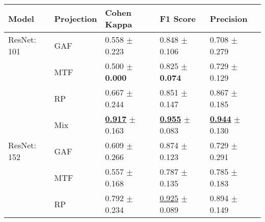 
\begin{tabular}{lllll}
\toprule
Model & Projection & Cohen Kappa & F1 Score & Precision \\
\midrule
ResNet: 101 & GAF & \textcolor[rgb]{0.8016949153,0.1983050847,0}{0.558} $\pm$ \textcolor[rgb]{0.8390827308,0.1609172692,0}{0.223} & \textcolor[rgb]{0.5824436536,0.4175563464,0}{0.848} $\pm$ \textcolor[rgb]{0.3085501457,0.5000000000,0}{0.106} & \textcolor[rgb]{0.8947368421,0.1052631579,0}{0.708} $\pm$ \textcolor[rgb]{0.9153570597,0.0846429403,0}{0.279} \\
 & MTF & \textcolor[rgb]{0.9322033898,0.0677966102,0}{0.500} $\pm$ \textbf{\textcolor[rgb]{0.0000000000,0.5000000000,0}{0.000}} & \textcolor[rgb]{0.7089758798,0.2910241202,0}{0.825} $\pm$ \textbf{\textcolor[rgb]{0.0000000000,0.5000000000,0}{0.074}} & \textcolor[rgb]{0.8157894737,0.1842105263,0}{0.729} $\pm$ \textcolor[rgb]{0.0086983842,0.5000000000,0}{0.129} \\
 & RP & \textcolor[rgb]{0.5593220339,0.4406779661,0}{0.667} $\pm$ \textcolor[rgb]{0.9177344209,0.0822655791,0}{0.244} & \textcolor[rgb]{0.5663107948,0.4336892052,0}{0.851} $\pm$ \textcolor[rgb]{0.6997338079,0.3002661921,0}{0.147} & \textcolor[rgb]{0.2947368421,0.5000000000,0}{0.867} $\pm$ \textcolor[rgb]{0.3495262089,0.5000000000,0}{0.185} \\
 & Mix & \underline{\textbf{\textcolor[rgb]{0.0000000000,0.5000000000,0}{0.917}}} $\pm$ \textcolor[rgb]{0.6114994881,0.3885005119,0}{0.163} & \underline{\textbf{\textcolor[rgb]{0.0000000000,0.5000000000,0}{0.955}}} $\pm$ \textcolor[rgb]{0.0859174230,0.5000000000,0}{0.083} & \underline{\textbf{\textcolor[rgb]{0.0000000000,0.5000000000,0}{0.944}}} $\pm$ \textcolor[rgb]{0.0148524795,0.5000000000,0}{0.130} \\
ResNet: 152 & GAF & \textcolor[rgb]{0.6881355932,0.3118644068,0}{0.609} $\pm$ \textcolor[rgb]{1.0000000000,0.0000000000,0}{0.266} & \textcolor[rgb]{0.4400948992,0.5000000000,0}{0.874} $\pm$ \textcolor[rgb]{0.4703014094,0.5000000000,0}{0.123} & \textcolor[rgb]{0.8157894737,0.1842105263,0}{0.729} $\pm$ \textcolor[rgb]{0.9907354857,0.0092645143,0}{0.291} \\
 & MTF & \textcolor[rgb]{0.8048022599,0.1951977401,0}{0.557} $\pm$ \textcolor[rgb]{0.6318123512,0.3681876488,0}{0.168} & \textcolor[rgb]{0.9199288256,0.0800711744,0}{0.787} $\pm$ \textcolor[rgb]{0.5890134114,0.4109865886,0}{0.135} & \textcolor[rgb]{0.6052631579,0.3947368421,0}{0.785} $\pm$ \textcolor[rgb]{0.3355159200,0.5000000000,0}{0.183} \\
 & RP & \textcolor[rgb]{0.2796610169,0.5000000000,0}{0.792} $\pm$ \textcolor[rgb]{0.8800980909,0.1199019091,0}{0.234} & \underline{\textcolor[rgb]{0.1648873072,0.5000000000,0}{0.925}} $\pm$ \textcolor[rgb]{0.1413273456,0.5000000000,0}{0.089} & \textcolor[rgb]{0.1913875598,0.5000000000,0}{0.894} $\pm$ \textcolor[rgb]{0.1342518553,0.5000000000,0}{0.149} \\

\end{tabular}
